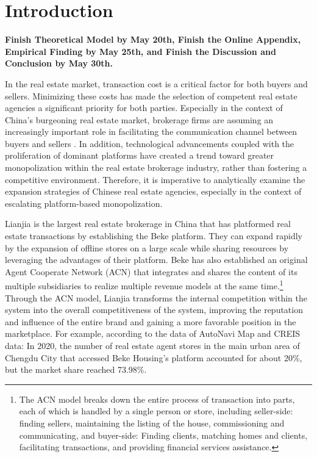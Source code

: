 \documentclass[12pt]{article}
\begin{document}

\section{Introduction \label{sec:introduction}}

\noindent

\textbf{Finish Theoretical Model by May 20th, Finish the Online Appendix, Empirical Finding by May 25th, and Finish the Discussion and Conclusion by May 30th.}


In the real estate market, transaction cost is a critical factor for both buyers and sellers. Minimizing these costs has made the selection of competent real estate agencies a significant priority for both parties. Especially in the context of China's burgeoning real estate market, brokerage firms are assuming an increasingly important role in facilitating the communication channel between buyers and sellers \citep{glaeser_real_2017}. In addition, technological advancements coupled with the proliferation of dominant platforms have created a trend toward greater monopolization within the real estate brokerage industry, rather than fostering a competitive environment. Therefore, it is imperative to analytically examine the expansion strategies of Chinese real estate agencies, especially in the context of escalating platform-based monopolization.

Lianjia is the largest real estate brokerage in China that has platformed real estate transactions by establishing the Beke platform. They can expand rapidly by the expansion of offline stores on a large scale while sharing resources by leveraging the advantages of their platform. Beke has also established an original Agent Cooperate Network (ACN) that integrates and shares the content of its multiple subsidiaries to realize multiple revenue models at the same time.\footnote{The ACN model breaks down the entire process of transaction into parts, each of which is handled by a single person or store, including seller-side: finding sellers, maintaining the listing of the house, commissioning and communicating, and buyer-side: Finding clients, matching homes and clients, facilitating transactions, and providing financial services assistance.} Through the ACN model, Lianjia transforms the internal competition within the system into the overall competitiveness of the system, improving the reputation and influence of the entire brand and gaining a more favorable position in the marketplace. For example, according to the data of AutoNavi Map and CREIS data: In 2020, the number of real estate agent stores in the main urban area of Chengdu City that accessed Beke Housing's platform accounted for about 20\%, but the market share reached 73.98\%.
\end{document}
